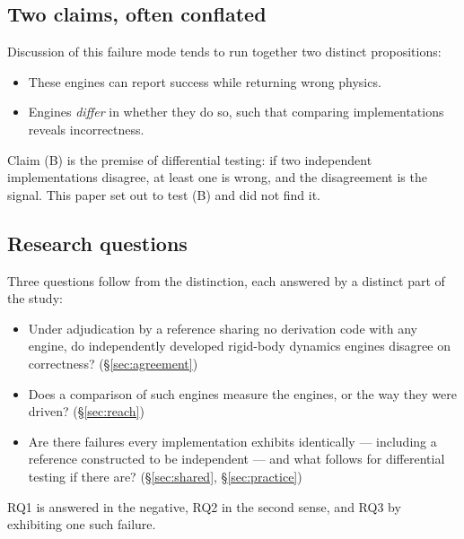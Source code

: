\documentclass[review,12pt]{elsarticle}
\begin{document}
\subsection{Two claims, often conflated}\label{sec:claims}
Discussion of this failure mode tends to run together two distinct propositions:

\begin{itemize}[leftmargin=2.2em,itemsep=0.25em]
  \item[\textbf{(A)}] These engines can report success while returning wrong
        physics.
  \item[\textbf{(B)}] Engines \emph{differ} in whether they do so, such that
        comparing implementations reveals incorrectness.
\end{itemize}

\noindent Claim (B) is the premise of differential testing: if two independent
implementations disagree, at least one is wrong, and the disagreement is the
signal. This paper set out to test (B) and did not find it.

\subsection{Research questions}\label{sec:rqs}
Three questions follow from the distinction, each answered by a distinct part of
the study:

\begin{itemize}[leftmargin=3.6em,itemsep=0.3em]
  \item[\textbf{RQ1}] Under adjudication by a reference sharing no derivation
        code with any engine, do independently developed rigid-body dynamics
        engines disagree on correctness? (\S\ref{sec:agreement})
  \item[\textbf{RQ2}] Does a comparison of such engines measure the engines, or
        the way they were driven? (\S\ref{sec:reach})
  \item[\textbf{RQ3}] Are there failures every implementation exhibits
        identically --- including a reference constructed to be independent ---
        and what follows for differential testing if there are?
        (\S\ref{sec:shared}, \S\ref{sec:practice})
\end{itemize}

\noindent RQ1 is answered in the negative, RQ2 in the second sense, and RQ3 by
exhibiting one such failure.
\end{document}

